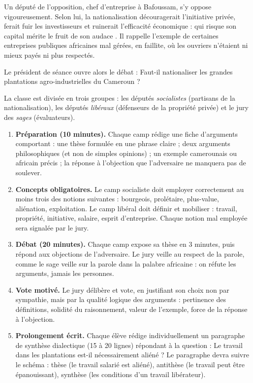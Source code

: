 \documentclass[11pt]{article}
\newcommand{\cle}[1]{{\popxbold\color{popdark}#1}}
\newcounter{popsec}
\newcounter{popsub}
\newcommand{\courssub}[1]{%
  \stepcounter{popsub}%
  \par\vspace{9pt}\noindent{\popxbold\fontsize{11.5}{13}\selectfont\color{popink}{\color{poporange}\thepopsec.\thepopsub}\hspace{6pt}#1}\par\nopagebreak\vspace{4pt}
}
\begin{document}
Un député de l'opposition, chef d'entreprise à Bafoussam, s'y oppose vigoureusement. Selon lui, la nationalisation découragerait l'initiative privée, ferait fuir les investisseurs et ruinerait l'efficacité économique : \guillemotleft qui risque son capital mérite le fruit de son audace \guillemotright. Il rappelle l'exemple de certaines entreprises publiques africaines mal gérées, en faillite, où les ouvriers n'étaient ni mieux payés ni plus respectés.

Le président de séance ouvre alors le débat : \guillemotleft Faut-il nationaliser les grandes plantations agro-industrielles du Cameroun ? \guillemotright

\courssub{Consignes}

La classe est divisée en trois groupes : les députés \emph{socialistes} (partisans de la nationalisation), les députés \emph{libéraux} (défenseurs de la propriété privée) et le jury des \emph{sages} (évaluateurs).

\begin{enumerate}
\item \textbf{Préparation (10 minutes).} Chaque camp rédige une fiche d'arguments comportant : une thèse formulée en une phrase claire ; deux arguments philosophiques (et non de simples opinions) ; un exemple camerounais ou africain précis ; la réponse à l'objection que l'adversaire ne manquera pas de soulever.
\item \textbf{Concepts obligatoires.} Le camp socialiste doit employer correctement au moins trois des notions suivantes : \cle{bourgeois}, \cle{prolétaire}, \cle{plus-value}, \cle{aliénation}, \cle{exploitation}. Le camp libéral doit définir et mobiliser : \cle{travail}, \cle{propriété}, \cle{initiative}, \cle{salaire}, \cle{esprit d'entreprise}. Chaque notion mal employée sera signalée par le jury.
\item \textbf{Débat (20 minutes).} Chaque camp expose sa thèse en 3 minutes, puis répond aux objections de l'adversaire. Le jury veille au respect de la parole, comme le sage veille sur la parole dans la palabre africaine : on réfute les arguments, jamais les personnes.
\item \textbf{Vote motivé.} Le jury délibère et vote, en justifiant son choix non par sympathie, mais par la qualité logique des arguments : pertinence des définitions, solidité du raisonnement, valeur de l'exemple, force de la réponse à l'objection.
\item \textbf{Prolongement écrit.} Chaque élève rédige individuellement un paragraphe de synthèse dialectique (15 à 20 lignes) répondant à la question : \guillemotleft Le travail dans les plantations est-il nécessairement aliéné ? \guillemotright Le paragraphe devra suivre le schéma : thèse (le travail salarié est aliéné), antithèse (le travail peut être épanouissant), synthèse (les conditions d'un travail libérateur).
\end{enumerate}
\end{document}
